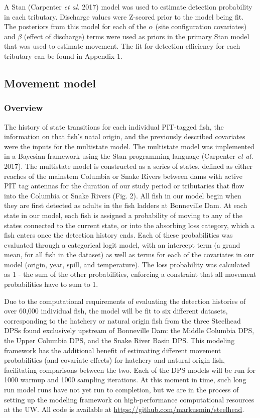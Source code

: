 \documentclass[
  12pt,
]{report}
\begin{document}
A Stan (Carpenter \emph{et al.} 2017) model was used to estimate
detection probability in each tributary. Discharge values were Z-scored
prior to the model being fit. The posteriors from this model for each of
the \(\alpha\) (site configuration covariates) and \(\beta\) (effect of
discharge) terms were used as priors in the primary Stan model that was
used to estimate movement. The fit for detection efficiency for each
tributary can be found in Appendix 1.

\hypertarget{movement-model}{%
\subsection{Movement model}\label{movement-model}}

\hypertarget{overview}{%
\subsubsection{Overview}\label{overview}}

The history of state transitions for each individual PIT-tagged fish,
the information on that fish's natal origin, and the previously
described covariates were the inputs for the multistate model. The
multistate model was implemented in a Bayesian framework using the Stan
programming language (Carpenter \emph{et al.} 2017). The multistate
model is constructed as a series of states, defined as either reaches of
the mainstem Columbia or Snake Rivers between dams with active PIT tag
antennas for the duration of our study period or tributaries that flow
into the Columbia or Snake Rivers (Fig. 2). All fish in our model begin
when they are first detected as adults in the fish ladders at Bonneville
Dam. At each state in our model, each fish is assigned a probability of
moving to any of the states connected to the current state, or into the
absorbing loss category, which a fish enters once the detection history
ends. Each of these probabilities was evaluated through a categorical
logit model, with an intercept term (a grand mean, for all fish in the
dataset) as well as terms for each of the covariates in our model
(origin, year, spill, and temperature). The loss probability was
calculated as 1 - the sum of the other probabilities, enforcing a
constraint that all movement probabilities have to sum to 1.

Due to the computational requirements of evaluating the detection
histories of over 60,000 individual fish, the model will be fit to six
different datasets, corresponding to the hatchery or natural origin fish
from the three Steelhead DPSs found exclusively upstream of Bonneville
Dam: the Middle Columbia DPS, the Upper Columbia DPS, and the Snake
River Basin DPS. This modeling framework has the additional benefit of
estimating different movement probabilities (and covariate effects) for
hatchery and natural origin fish, facilitating comparisons between the
two. Each of the DPS models will be run for 1000 warmup and 1000
sampling iterations. At this moment in time, such long run model runs
have not yet run to completion, but we are in the process of setting up
the modeling framework on high-performance computational resources at
the UW. All code is available at
\url{https://github.com/markusmin/steelhead}.
\end{document}
